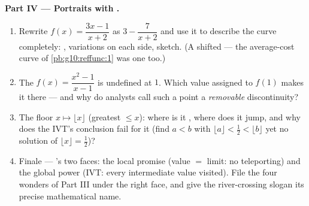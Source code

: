 \begin{problem}
\medskip
\noindent\textbf{Part IV --- Portraits with .}
\begin{enumerate}[resume]
  \item Rewrite $f(x) = \dfrac{3x - 1}{x + 2}$ as
        $3 - \dfrac{7}{x + 2}$ and use it to describe the curve
        completely: , variations on each side,
        sketch. (A shifted  --- the average-cost curve
        of \cref{pb:g10:reffunc:1} was one too.)
  \item The  $f(x) = \dfrac{x^2 - 1}{x - 1}$ is
        undefined at $1$. Which value assigned to $f(1)$ makes
        it  there --- and why do analysts call such a
        point a \emph{removable} discontinuity?
  \item The floor  $x \mapsto \lfloor x \rfloor$
        (greatest  $\leq x$): where is it ,
        where does it jump, and why does the IVT's conclusion
        fail for it (find $a < b$ with
        $\lfloor a \rfloor < \frac12 < \lfloor b \rfloor$ yet
        no solution of $\lfloor x \rfloor = \frac12$)?
  \item Finale --- 's two faces: the local promise
        (value $=$ limit: no teleporting) and the global power
        (IVT: every intermediate value visited). File the four
        wonders of Part III under the right face, and give the
        river-crossing slogan its precise mathematical name.
\end{enumerate}
\end{problem}
